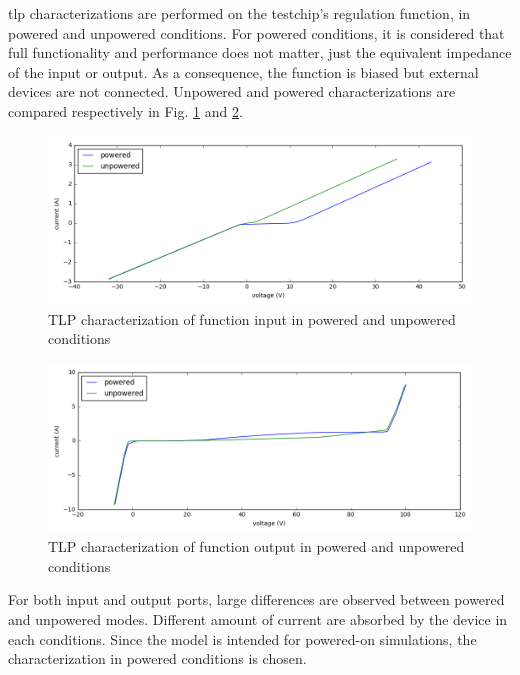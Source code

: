 \gls{tlp} characterizations are performed on the testchip's regulation function, in powered and unpowered conditions.
For powered conditions, it is considered that full functionality and performance does not matter, just the equivalent impedance of the input or output.
As a consequence, the function is biased but external devices are not connected.
Unpowered and powered characterizations are compared respectively in Fig. \ref{fig:tlp-input-cz} and \ref{fig:tlp-output-cz}.

\begin{figure}[!h]
  \centering
  \includegraphics[width=\textwidth]{src/1/figures/tlp_input_characterization.png}
  \caption{TLP characterization of function input in powered and unpowered conditions}
  \label{fig:tlp-input-cz}
\end{figure}

\begin{figure}[!h]
  \centering
  \includegraphics[width=\textwidth]{src/1/figures/tlp_output_characterization.png}
  \caption{TLP characterization of function output in powered and unpowered conditions}
  \label{fig:tlp-output-cz}
\end{figure}


For both input and output ports, large differences are observed between powered and unpowered modes.
Different amount of current are absorbed by the device in each conditions.
Since the model is intended for powered-on simulations, the characterization in powered conditions is chosen.

